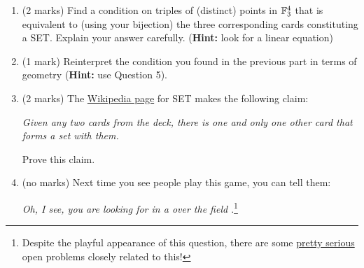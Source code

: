 \documentclass[12pt]{article}
\begin{document}
\begin{enumerate}
\begin{enumerate}
  \item (2 marks) Find a condition on triples of (distinct) points in $\bF_3^4$ that is equivalent to (using your bijection) the three corresponding cards constituting a SET. Explain your answer carefully. (\textbf{Hint:} look for a linear equation)
  \item (1 mark) Reinterpret the condition you found in the previous part in terms of geometry (\textbf{Hint:} use Question 5).
  \item (2 marks) The \href{https://en.wikipedia.org/wiki/Set_(card_game)}{Wikipedia page} for SET makes the following claim:
    \begin{center}
      \textit{Given any two cards from the deck, there is one and only one other card that forms a set with them.}
    \end{center}
    Prove this claim.
  \item (no marks) Next time you see people play this game, you can tell them:
    \begin{center}
    \textit{Oh, I see, you are looking for \underline{\phantom{lines}} in a \underline{\phantom{vector space}} over the field \underline{\phantom{$\bF_3^4$}} }.\footnote{Despite the playful appearance of this question, there are some \href{https://terrytao.wordpress.com/2007/02/23/open-question-best-bounds-for-cap-sets/}{pretty serious} open problems closely related to this!}
    \end{center}
    
  \end{enumerate}
\end{enumerate}


{}

\end{document}
